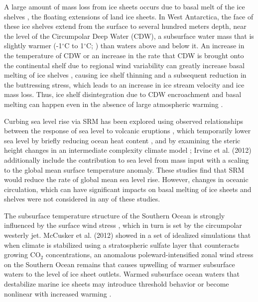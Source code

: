 \documentclass{nature}
\begin{document}
A large amount of mass loss from ice sheets occurs due to basal melt of the ice shelves \cite{joughin11}, the floating extensions of land ice sheets. In West Antarctica, the face of these ice shelves extend from the surface to several hundred meters depth, near the level of the Circumpolar Deep Water (CDW), a subsurface water mass that is slightly warmer (-1$^\circ$C to 1$^\circ$C; \cite{yin11}) than waters above and below it. An increase in the temperature of CDW or an increase in the rate that CDW is brought onto the continental shelf due to regional wind variability can greatly increase basal melting of ice shelves \cite{thoma08,joughin11}, causing ice shelf thinning and a subsequent reduction in the buttressing stress, which leads to an increase in ice stream velocity and ice mass loss\cite{oppenheimer98,pritchard12}. Thus, ice shelf disintegration due to CDW encroachment and basal melting can happen even in the absence of large atmospheric warming \cite{oppenheimer98}. %

Curbing sea level rise via SRM has been explored using observed relationships between the response of sea level to volcanic eruptions \cite{moore10}, which temporarily lower sea level by briefly reducing ocean heat content \cite{church05,gleckler06}, and by examining the steric height changes in an intermediate complexity climate model \cite{irvine12}; Irvine et al. (2012) additionally include the contribution to sea level from mass input with a scaling to the global mean surface temperature anomaly. These studies find that SRM would reduce the rate of global mean sea level rise. However, changes in oceanic circulation, which can have significant impacts on basal melting of ice sheets and shelves \cite{steig13,joughin11,thoma08} were not considered in any of these studies. 

The subsurface temperature structure of the Southern Ocean is strongly influenced by the surface wind stress \cite{fyfe07}, which in turn is set by the circumpolar westerly jet. McCusker et al. (2012) showed in a set of idealized simulations that when climate is stabilized using a stratospheric sulfate layer that counteracts growing CO$_2$ concentrations, an anomalous poleward-intensified zonal wind stress on the Southern Ocean remains that causes upwelling of warmer subsurface waters to the level of ice sheet outlets. Warmed subsurface ocean waters that destabilize marine ice sheets may introduce threshold behavior \cite{notz09} or become nonlinear with increased warming \cite{joughin14}.
\end{document}

